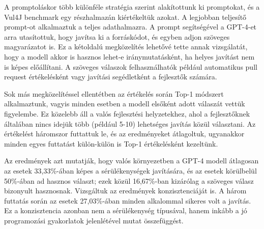 \documentclass[12pt,a4paper]{extarticle}
\begin{document}
A promptoláskor több különféle stratégia szerint alakítottunk ki promptokat, és a Vul4J benchmark egy részhalmazán kiértékeltük azokat.
A legjobban teljesítő prompt-ot alkalmaztuk a teljes adathalmazra.
A prompt segítségével a GPT-4-et arra utasítottuk, hogy javítsa ki a forráskódot, és egyben adjon szöveges magyarázatot is.
Ez a kétoldalú meg\-kö\-ze\-lí\-tés lehetővé tette annak vizsgálatát, hogy a modell akkor is hasznos lehet-e i\-rány\-mu\-ta\-tás\-ként, ha helyes javítást nem is képes előállítani.
A szöveges válaszok felhasználhatók például automatikus pull request értékelésként vagy javítási segédletként a fejlesztők szá\-má\-ra.

Sok más megközelítéssel ellentétben az értékelés során Top-1 módszert alkalmaztunk, vagyis minden esetben a modell elsőként adott válaszát vettük figyelembe.
Ez közelebb áll a valós fejlesztési helyzetekhez, ahol a fejlesztőknek általában nincs idejük több (például 5-10) lehetséges javítás közül választani.
Az értékelést háromszor futtattuk le, és az eredményeket átlagoltuk, ugyanakkor minden egyes futtatást külön-külön is Top-1 ér\-té\-ke\-lés\-ként kezeltünk.

Az eredmények azt mutatják, hogy valós környezetben a GPT-4 modell átlagosan az esetek 33,33\%-ában képes a sérülékenységek javítására, és az esetek körülbelül 50\%-ában ad hasznos választ; ezek közül 16,67\%-ban kizárólag a szöveges válasz bizonyult hasznosnak.
Vizsgáltuk az eredmények konzisztenciáját is.
A három futtatás során az esetek 27,03\%-ában minden alkalommal sikeres volt a javítás.
Ez a konzisztencia azonban nem a sérülékenység típusával, hanem inkább a jó programozási gyakorlatok jelenlétével mutat összefüggést.
\end{document}
